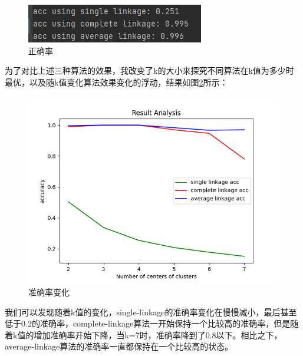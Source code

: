 \documentclass[UTF8,a4paper,10pt]{ctexart}
\begin{document}
\begin{figure}[H]
    \centering
    \includegraphics[scale=0.7]{5.png}
    \caption{正确率}
    \label{fig:1}
\end{figure}

为了对比上述三种算法的效果，我改变了k的大小来探究不同算法在k值为多少时最优，以及随k值变化算法效果变化的浮动，结果如图\ref{fig:1}所示：

\begin{figure}[H]
    \centering
    \includegraphics[scale=0.7]{6.png}
    \caption{准确率变化}
    \label{fig:1}
\end{figure}

我们可以发现随着k值的变化，single-linkage的准确率变化在慢慢减小，最后甚至低于0.2的准确率，complete-linkage算法一开始保持一个比较高的准确率，但是随着k值的增加准确率开始下降，当k=7时，准确率降到了0.8以下。相比之下，
average-linkage算法的准确率一直都保持在一个比较高的状态。


\end{document}
